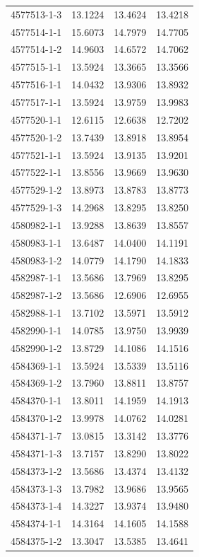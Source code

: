 \begin{longtable}{lrrr}
4577513-1-3 & 13.1224 & 13.4624 & 13.4218 \\
4577514-1-1 & 15.6073 & 14.7979 & 14.7705 \\
4577514-1-2 & 14.9603 & 14.6572 & 14.7062 \\
4577515-1-1 & 13.5924 & 13.3665 & 13.3566 \\
4577516-1-1 & 14.0432 & 13.9306 & 13.8932 \\
4577517-1-1 & 13.5924 & 13.9759 & 13.9983 \\
4577520-1-1 & 12.6115 & 12.6638 & 12.7202 \\
4577520-1-2 & 13.7439 & 13.8918 & 13.8954 \\
4577521-1-1 & 13.5924 & 13.9135 & 13.9201 \\
4577522-1-1 & 13.8556 & 13.9669 & 13.9630 \\
4577529-1-2 & 13.8973 & 13.8783 & 13.8773 \\
4577529-1-3 & 14.2968 & 13.8295 & 13.8250 \\
4580982-1-1 & 13.9288 & 13.8639 & 13.8557 \\
4580983-1-1 & 13.6487 & 14.0400 & 14.1191 \\
4580983-1-2 & 14.0779 & 14.1790 & 14.1833 \\
4582987-1-1 & 13.5686 & 13.7969 & 13.8295 \\
4582987-1-2 & 13.5686 & 12.6906 & 12.6955 \\
4582988-1-1 & 13.7102 & 13.5971 & 13.5912 \\
4582990-1-1 & 14.0785 & 13.9750 & 13.9939 \\
4582990-1-2 & 13.8729 & 14.1086 & 14.1516 \\
4584369-1-1 & 13.5924 & 13.5339 & 13.5116 \\
4584369-1-2 & 13.7960 & 13.8811 & 13.8757 \\
4584370-1-1 & 13.8011 & 14.1959 & 14.1913 \\
4584370-1-2 & 13.9978 & 14.0762 & 14.0281 \\
4584371-1-7 & 13.0815 & 13.3142 & 13.3776 \\
4584371-1-3 & 13.7157 & 13.8290 & 13.8022 \\
4584373-1-2 & 13.5686 & 13.4374 & 13.4132 \\
4584373-1-3 & 13.7982 & 13.9686 & 13.9565 \\
4584373-1-4 & 14.3227 & 13.9374 & 13.9480 \\
4584374-1-1 & 14.3164 & 14.1605 & 14.1588 \\
4584375-1-2 & 13.3047 & 13.5385 & 13.4641 \\

\end{longtable}
